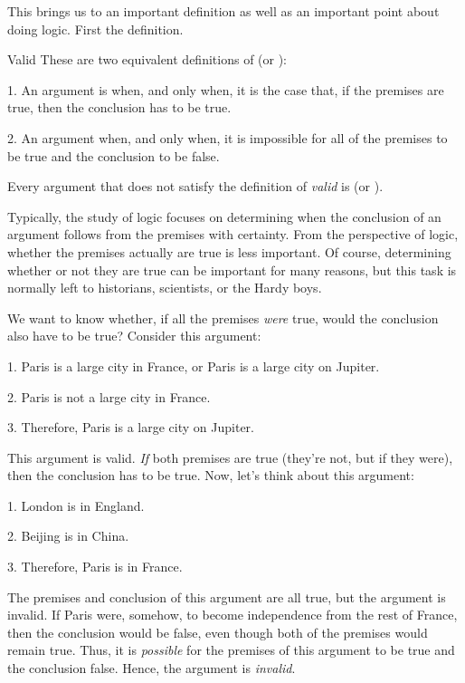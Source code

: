This brings us to an important definition as well as an important point about doing logic. First the definition. 
\begin{factboxy}{Valid}
These are two equivalent definitions of  (or ):

1. An argument is  when, and only when, it is the case that, if the premises are true, then the conclusion has to be true.
\smallskip

2. An argument  when, and only when, it is impossible for all of the premises to be true and the conclusion to be false.
\smallskip

Every argument that does not satisfy the definition of \textit{valid} is  (or ).
\end{factboxy}
\noindent Typically, the study of logic focuses on determining when the conclusion of an argument follows from the premises with certainty. From the perspective of logic, whether the premises actually are true is less important. Of course, determining whether or not they are true can be important for many reasons, but this task is normally left to historians, scientists, or the Hardy boys.

We want to know whether, if all the premises \textit{were} true, would the conclusion also have to be true? Consider this argument:
	\begin{earg}
		\item[1.] Paris is a large city in France, or Paris is a large city on Jupiter.
		\item[2.] Paris is not a large city in France.
		\item[3.] Therefore, Paris is a large city on Jupiter.
	\end{earg}
This argument is valid. \emph{If} both premises are true (they're not, but if they were), then the conclusion has to be true. Now, let's think about this argument:
	\begin{earg}
		\item[1.] London is in England.
		\item[2.] Beijing is in China.
		\item[3.] Therefore, Paris is in France.
	\end{earg}
The premises and conclusion of this argument are all true, but the argument is invalid. If Paris were, somehow, to become independence from the rest of France, then the conclusion would be false, even though both of the premises would remain true. Thus, it is \emph{possible} for the premises of this argument to be true and the conclusion false. Hence, the argument is \textit{invalid}.

